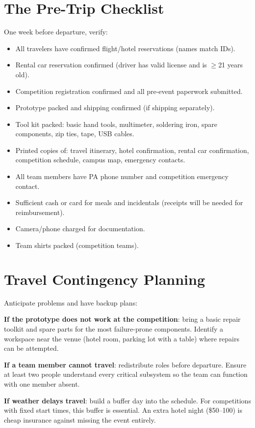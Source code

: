 \section{The Pre-Trip Checklist}
One week before departure, verify:

\begin{itemize}[nosep,leftmargin=1.5em]
\item All travelers have confirmed flight/hotel reservations (names match IDs).
\item Rental car reservation confirmed (driver has valid license and is $\geq$21 years old).
\item Competition registration confirmed and all pre-event paperwork submitted.
\item Prototype packed and shipping confirmed (if shipping separately).
\item Tool kit packed: basic hand tools, multimeter, soldering iron, spare components, zip ties, tape, USB cables.
\item Printed copies of: travel itinerary, hotel confirmation, rental car confirmation, competition schedule, campus map, emergency contacts.
\item All team members have PA phone number and competition emergency contact.
\item Sufficient cash or card for meals and incidentals (receipts will be needed for reimbursement).
\item Camera/phone charged for documentation.
\item Team shirts packed (competition teams).
\end{itemize}

\section{Travel Contingency Planning}
Anticipate problems and have backup plans:

\textbf{If the prototype does not work at the competition}: bring a basic repair toolkit and spare parts for the most failure-prone components. Identify a workspace near the venue (hotel room, parking lot with a table) where repairs can be attempted.

\textbf{If a team member cannot travel}: redistribute roles before departure. Ensure at least two people understand every critical subsystem so the team can function with one member absent.

\textbf{If weather delays travel}: build a buffer day into the schedule. For competitions with fixed start times, this buffer is essential. An extra hotel night (\$50--100) is cheap insurance against missing the event entirely.

